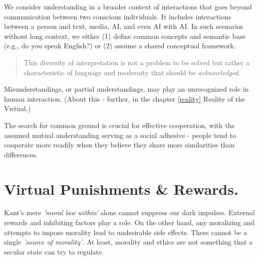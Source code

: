 \documentclass[11pt,a4]{article}
\begin{document}





        We consider understanding in a broader context of interactions
        that goes beyond communication between two conscious individuals. It includes interactions
        between a person and text, media, AI,
        and even AI with AI. In such scenarios
        without long context, we either (1) define common concepts and semantic
        base (e.g., do you speak English?) or (2) assume a
        shared conceptual framework.
        \begin{quote}
            This diversity of interpretation is not a problem to be solved
            but rather a characteristic of language and modernity that
            should be \textit{acknowledged}.
        \end{quote}


        Misunderstandings, or partial understandings, may play an
        unrecognized role in human interaction.
        (About this - further, in the chapter \ref{reality} Reality of the Virtual.)

        The search for common ground is crucial for
        effective cooperation, with the assumed mutual understanding
        serving as a social adhesive - people tend to cooperate more readily
        when they believe they share more similarities than differences.





\section{Virtual Punishments \& Rewards.}

Kant's mere \textit{'moral law within'} alone cannot suppress our
dark impulses. External rewards and inhibiting factors play a role.
On the other hand,  any moralizing and attempts to impose morality
lead to undesirable side effects. There cannot be
a single \textit{'source of morality'}.
At least, morality and ethics are not something that a
secular state can try to regulate.
\end{document}
